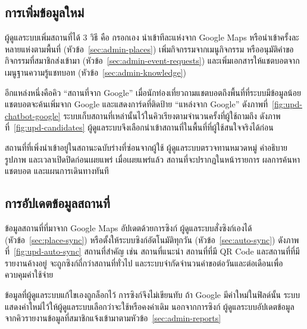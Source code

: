 \subsection{การเพิ่มข้อมูลใหม่}

ผู้ดูแลระบบเพิ่มสถานที่ได้ 3 วิธี คือ กรอกเอง นำเข้าทีละแห่งจาก Google Maps หรือนำเข้าครั้งละหลายแห่งตามพื้นที่ (หัวข้อ~\ref{sec:admin-places}) เพิ่มกิจกรรมจากเมนูกิจกรรม หรืออนุมัติคำขอกิจกรรมที่สมาชิกส่งเข้ามา (หัวข้อ~\ref{sec:admin-event-requests}) และเพิ่มเอกสารให้แชตบอตจากเมนูฐานความรู้แชทบอท (หัวข้อ~\ref{sec:admin-knowledge})

อีกแหล่งหนึ่งคือคิว ``สถานที่จาก Google'' เมื่อนักท่องเที่ยวถามแชตบอตถึงพื้นที่ที่ระบบมีข้อมูลน้อย แชตบอตจะค้นเพิ่มจาก Google และแสดงการ์ดที่ติดป้าย ``แหล่งจาก Google'' ดังภาพที่~\ref{fig:upd-chatbot-google} ระบบเก็บสถานที่เหล่านั้นไว้ในคิวเรียงตามจำนวนครั้งที่ผู้ใช้ถามถึง ดังภาพที่~\ref{fig:upd-candidates} ผู้ดูแลระบบจึงเลือกนำเข้าสถานที่ในพื้นที่ที่ผู้ใช้สนใจจริงได้ก่อน



สถานที่ที่เพิ่งนำเข้าอยู่ในสถานะฉบับร่างที่ซ่อนจากผู้ใช้ ผู้ดูแลระบบตรวจทานหมวดหมู่ คำอธิบาย รูปภาพ และเวลาเปิดปิดก่อนเผยแพร่ เมื่อเผยแพร่แล้ว สถานที่จะปรากฏในหน้ารายการ ผลการค้นหา แชตบอต และแผนการเดินทางทันที

\subsection{การอัปเดตข้อมูลสถานที่}

ข้อมูลสถานที่ที่มาจาก Google Maps อัปเดตด้วยการซิงก์ ผู้ดูแลระบบสั่งซิงก์เองได้ (หัวข้อ~\ref{sec:place-sync}) หรือตั้งให้ระบบซิงก์อัตโนมัติทุกวัน (หัวข้อ~\ref{sec:auto-sync}) ดังภาพที่~\ref{fig:upd-auto-sync} สถานที่สำคัญ เช่น สถานที่แนะนำ สถานที่ที่มี QR Code และสถานที่ที่มีรายงานค้างอยู่ จะถูกซิงก์ถี่กว่าสถานที่ทั่วไป และระบบจำกัดจำนวนคำขอต่อวันและต่อเดือนเพื่อควบคุมค่าใช้จ่าย


ข้อมูลที่ผู้ดูแลระบบแก้ไขเองถูกล็อกไว้ การซิงก์จึงไม่เขียนทับ ถ้า Google มีค่าใหม่ในฟิลด์นั้น ระบบแสดงค่าใหม่ไว้ให้ผู้ดูแลระบบเลือกว่าจะใช้หรือคงค่าเดิม นอกจากการซิงก์ ผู้ดูแลระบบอัปเดตข้อมูลจากคิวรายงานข้อมูลที่สมาชิกแจ้งเข้ามาตามหัวข้อ~\ref{sec:admin-reports}

